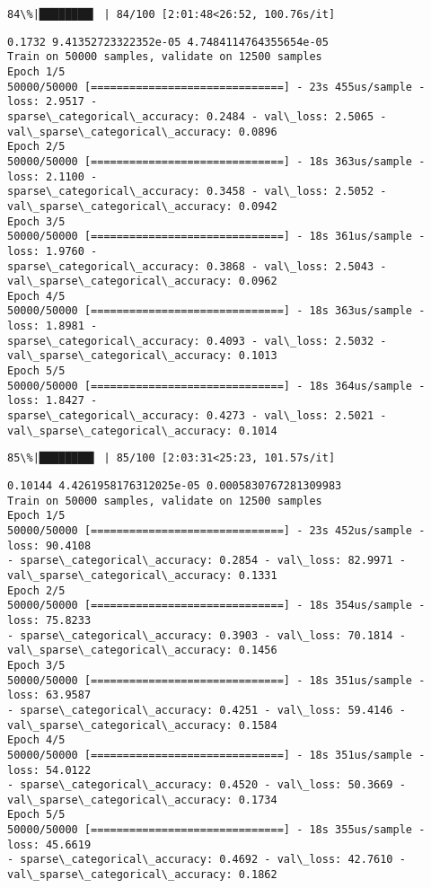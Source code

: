 \documentclass[11pt]{article}
\begin{document}
    \begin{Verbatim}[commandchars=\\\{\}]
 84\%|████████▍ | 84/100 [2:01:48<26:52, 100.76s/it]
    \end{Verbatim}

    \begin{Verbatim}[commandchars=\\\{\}]
0.1732 9.41352723322352e-05 4.7484114764355654e-05
Train on 50000 samples, validate on 12500 samples
Epoch 1/5
50000/50000 [==============================] - 23s 455us/sample - loss: 2.9517 -
sparse\_categorical\_accuracy: 0.2484 - val\_loss: 2.5065 -
val\_sparse\_categorical\_accuracy: 0.0896
Epoch 2/5
50000/50000 [==============================] - 18s 363us/sample - loss: 2.1100 -
sparse\_categorical\_accuracy: 0.3458 - val\_loss: 2.5052 -
val\_sparse\_categorical\_accuracy: 0.0942
Epoch 3/5
50000/50000 [==============================] - 18s 361us/sample - loss: 1.9760 -
sparse\_categorical\_accuracy: 0.3868 - val\_loss: 2.5043 -
val\_sparse\_categorical\_accuracy: 0.0962
Epoch 4/5
50000/50000 [==============================] - 18s 363us/sample - loss: 1.8981 -
sparse\_categorical\_accuracy: 0.4093 - val\_loss: 2.5032 -
val\_sparse\_categorical\_accuracy: 0.1013
Epoch 5/5
50000/50000 [==============================] - 18s 364us/sample - loss: 1.8427 -
sparse\_categorical\_accuracy: 0.4273 - val\_loss: 2.5021 -
val\_sparse\_categorical\_accuracy: 0.1014
    \end{Verbatim}

    \begin{Verbatim}[commandchars=\\\{\}]
 85\%|████████▌ | 85/100 [2:03:31<25:23, 101.57s/it]
    \end{Verbatim}

    \begin{Verbatim}[commandchars=\\\{\}]
0.10144 4.4261958176312025e-05 0.0005830767281309983
Train on 50000 samples, validate on 12500 samples
Epoch 1/5
50000/50000 [==============================] - 23s 452us/sample - loss: 90.4108
- sparse\_categorical\_accuracy: 0.2854 - val\_loss: 82.9971 -
val\_sparse\_categorical\_accuracy: 0.1331
Epoch 2/5
50000/50000 [==============================] - 18s 354us/sample - loss: 75.8233
- sparse\_categorical\_accuracy: 0.3903 - val\_loss: 70.1814 -
val\_sparse\_categorical\_accuracy: 0.1456
Epoch 3/5
50000/50000 [==============================] - 18s 351us/sample - loss: 63.9587
- sparse\_categorical\_accuracy: 0.4251 - val\_loss: 59.4146 -
val\_sparse\_categorical\_accuracy: 0.1584
Epoch 4/5
50000/50000 [==============================] - 18s 351us/sample - loss: 54.0122
- sparse\_categorical\_accuracy: 0.4520 - val\_loss: 50.3669 -
val\_sparse\_categorical\_accuracy: 0.1734
Epoch 5/5
50000/50000 [==============================] - 18s 355us/sample - loss: 45.6619
- sparse\_categorical\_accuracy: 0.4692 - val\_loss: 42.7610 -
val\_sparse\_categorical\_accuracy: 0.1862
    \end{Verbatim}
\end{document}
